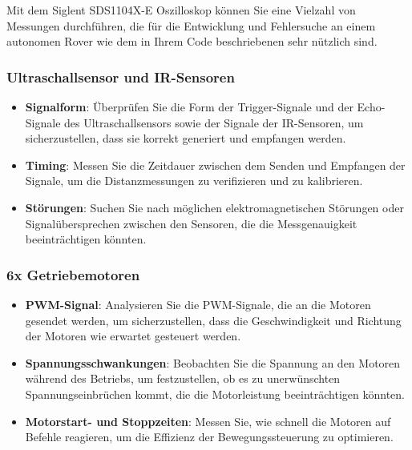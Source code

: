 \documentclass{vorlage-design-main}
\begin{document}
Mit dem Siglent SDS1104X-E Oszilloskop können Sie eine Vielzahl von
Messungen durchführen, die für die Entwicklung und Fehlersuche an einem
autonomen Rover wie dem in Ihrem Code beschriebenen sehr nützlich sind.

\hypertarget{ultraschallsensor-und-ir-sensoren}{%
\subsubsection{Ultraschallsensor und
IR-Sensoren}\label{ultraschallsensor-und-ir-sensoren}}

\begin{itemize}

\item
  \textbf{Signalform}: Überprüfen Sie die Form der Trigger-Signale und
  der Echo-Signale des Ultraschallsensors sowie der Signale der
  IR-Sensoren, um sicherzustellen, dass sie korrekt generiert und
  empfangen werden.
\item
  \textbf{Timing}: Messen Sie die Zeitdauer zwischen dem Senden und
  Empfangen der Signale, um die Distanzmessungen zu verifizieren und zu
  kalibrieren.
\item
  \textbf{Störungen}: Suchen Sie nach möglichen elektromagnetischen
  Störungen oder Signalübersprechen zwischen den Sensoren, die die
  Messgenauigkeit beeinträchtigen könnten.
\end{itemize}

\hypertarget{x-getriebemotoren}{%
\subsubsection{6x Getriebemotoren}\label{x-getriebemotoren}}

\begin{itemize}

\item
  \textbf{PWM-Signal}: Analysieren Sie die PWM-Signale, die an die
  Motoren gesendet werden, um sicherzustellen, dass die Geschwindigkeit
  und Richtung der Motoren wie erwartet gesteuert werden.
\item
  \textbf{Spannungsschwankungen}: Beobachten Sie die Spannung an den
  Motoren während des Betriebs, um festzustellen, ob es zu unerwünschten
  Spannungseinbrüchen kommt, die die Motorleistung beeinträchtigen
  könnten.
\item
  \textbf{Motorstart- und Stoppzeiten}: Messen Sie, wie schnell die
  Motoren auf Befehle reagieren, um die Effizienz der Bewegungssteuerung
  zu optimieren.
\end{itemize}
\end{document}
